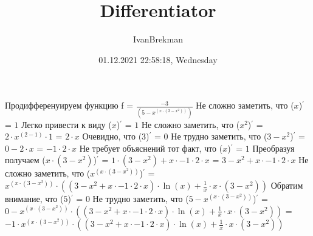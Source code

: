 \documentclass{article}
\title{Differentiator}
\author{IvanBrekman}
\date{01.12.2021 22:58:18, Wednesday}
\begin{document}
\maketitle

Продифференуируем функцию f = $ \frac{-3}{(5 - {x}^{(x \cdot (3 - {x}^{2}))})} $\newline
Не сложно заметить, что \newline
($ x $)$ ^\prime $ = $ 1 $\newline
\newline
Легко привести к виду \newline
($ x $)$ ^\prime $ = $ 1 $\newline
\newline
Не сложно заметить, что \newline
($ {x}^{2} $)$ ^\prime $ = $ 2 \cdot {x}^{(2 - 1)} \cdot 1 $ = $ 2 \cdot x $\newline
\newline
Очевидно, что \newline
($ 3 $)$ ^\prime $ = $ 0 $\newline
\newline
Не трудно заметить, что \newline
($ 3 - {x}^{2} $)$ ^\prime $ = $ 0 - 2 \cdot x $ = $ -1 \cdot 2 \cdot x $\newline
\newline
Не требует объяснений тот факт, что \newline
($ x $)$ ^\prime $ = $ 1 $\newline
\newline
Преобразуя получаем \newline
($ x \cdot (3 - {x}^{2}) $)$ ^\prime $ = $ 1 \cdot (3 - {x}^{2}) + x \cdot -1 \cdot 2 \cdot x $ = $ 3 - {x}^{2} + x \cdot -1 \cdot 2 \cdot x $\newline
\newline
Не сложно заметить, что \newline
($ {x}^{(x \cdot (3 - {x}^{2}))} $)$ ^\prime $ = $ {x}^{(x \cdot (3 - {x}^{2}))} \cdot ((3 - {x}^{2} + x \cdot -1 \cdot 2 \cdot x) \cdot \ln{(x)} + \frac{1}{x} \cdot x \cdot (3 - {x}^{2})) $\newline
\newline
Обратим внимание, что \newline
($ 5 $)$ ^\prime $ = $ 0 $\newline
\newline
Не трудно заметить, что \newline
($ 5 - {x}^{(x \cdot (3 - {x}^{2}))} $)$ ^\prime $ = $ 0 - {x}^{(x \cdot (3 - {x}^{2}))} \cdot ((3 - {x}^{2} + x \cdot -1 \cdot 2 \cdot x) \cdot \ln{(x)} + \frac{1}{x} \cdot x \cdot (3 - {x}^{2})) $ = $ -1 \cdot {x}^{(x \cdot (3 - {x}^{2}))} \cdot ((3 - {x}^{2} + x \cdot -1 \cdot 2 \cdot x) \cdot \ln{(x)} + \frac{1}{x} \cdot x \cdot (3 - {x}^{2})) $\newline
\end{document}
